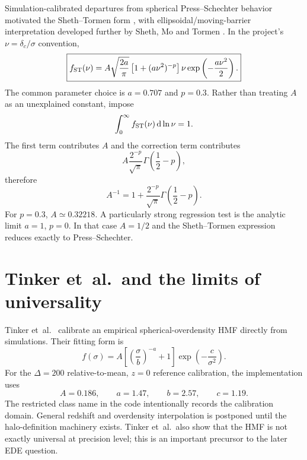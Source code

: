 \documentclass[11pt]{article}
\newcommand{\dd}{\,\mathrm d}
\begin{document}
Simulation-calibrated departures from spherical Press--Schechter behavior motivated the Sheth--Tormen form \cite{ShethTormen1999}, with ellipsoidal/moving-barrier interpretation developed further by Sheth, Mo and Tormen \cite{ShethMoTormen2001}. In the project's $\nu=\delta_c/\sigma$ convention,
\begin{equation}
\boxed{
f_{\rm ST}(\nu)=A\sqrt{\frac{2a}{\pi}}
\left[1+(a\nu^2)^{-p}\right]\nu
\exp\left(-\frac{a\nu^2}{2}\right).
}
\end{equation}
The common parameter choice is $a=0.707$ and $p=0.3$. Rather than treating $A$ as an unexplained constant, impose
\begin{equation}
\int_0^\infty f_{\rm ST}(\nu)\dd\ln\nu=1.
\end{equation}
The first term contributes $A$ and the correction term contributes
\begin{equation}
A\frac{2^{-p}}{\sqrt\pi}\Gamma\left(\frac12-p\right),
\end{equation}
therefore
\begin{equation}
\boxed{
A^{-1}=1+\frac{2^{-p}}{\sqrt\pi}\Gamma\left(\frac12-p\right).
}
\end{equation}
For $p=0.3$, $A\simeq0.32218$. A particularly strong regression test is the analytic limit $a=1$, $p=0$. In that case $A=1/2$ and the Sheth--Tormen expression reduces exactly to Press--Schechter.

\section{Tinker et~al.\ and the limits of universality}

Tinker et~al.\ \cite{TinkerEtAl2008} calibrate an empirical spherical-overdensity HMF directly from simulations. Their fitting form is
\begin{equation}
\boxed{
f(\sigma)=A\left[\left(\frac{\sigma}{b}\right)^{-a}+1\right]
\exp\left(-\frac{c}{\sigma^2}\right).
}
\end{equation}
For the $\Delta=200$ relative-to-mean, $z=0$ reference calibration, the implementation uses
\begin{equation}
A=0.186,\qquad a=1.47,\qquad b=2.57,\qquad c=1.19.
\end{equation}
The restricted class name in the code intentionally records the calibration domain. General redshift and overdensity interpolation is postponed until the halo-definition machinery exists. Tinker et~al.\ also show that the HMF is not exactly universal at precision level; this is an important precursor to the later EDE question.
\end{document}

